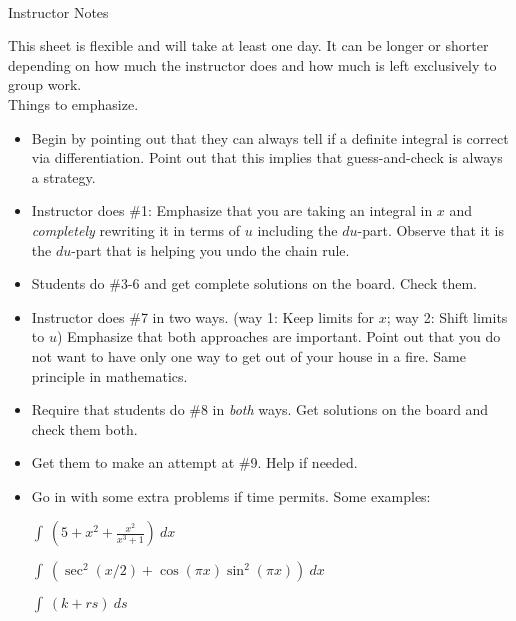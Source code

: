 \documentclass[11pt,fleqn]{article}
\begin{document}
\vspace*{-0.7in}

\begin{center}
  \Large{}\\
  Instructor Notes
  \end{center}
 This sheet is flexible and will take at least one day. It can be longer or shorter depending on how much the instructor does and how much is left exclusively to group work.\\
 
 Things to emphasize.
 
 \begin{itemize}
 
 \item Begin by pointing out that they can always tell if a definite integral is correct via differentiation. Point out that this implies that guess-and-check is always a strategy.
 
 \item Instructor does \#1: Emphasize that you are taking an integral in $x$ and \emph{completely} rewriting it in terms of $u$ including the $du$-part. Observe that it is the $du$-part that is helping you undo the chain rule. 
 
 \item Students do \#3-6 and get complete solutions on the board. Check them.
 
\item Instructor does \#7 in two ways. (way 1: Keep limits for $x$; way 2: Shift limits to $u$) Emphasize that both approaches are important. Point out that you do not want to have only one way to get out of your house in a fire. Same principle in mathematics. 

\item Require that students do \#8 in \emph{both} ways. Get solutions on the board and check them both. 

\item Get them to make an attempt at \#9. Help if needed.

\item Go in with some extra problems if time permits. Some examples:

$\displaystyle \int \: \left(5+x^2+\frac{x^2}{x^3+1}\right)\: dx$

$\displaystyle \int \: \left(\sec^2(x/2) + \cos(\pi x) \sin^2(\pi x)\right)\: dx$

$\displaystyle \int \: (k+rs )\: ds$
\end{itemize}
\end{document}
